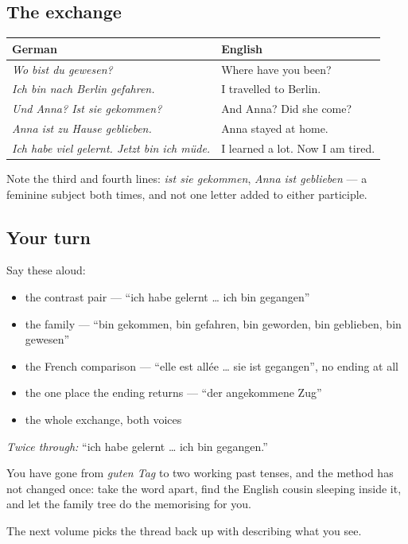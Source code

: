 \subsection*{The exchange}
\noindent
\begin{tabularx}{\linewidth}{@{}>{\raggedright\arraybackslash}X>{\raggedright\arraybackslash}X@{}}
\toprule
\textbf{German} & \textbf{English} \\
\midrule
\emph{Wo bist du gewesen?} & Where have you been? \\
\emph{Ich bin nach Berlin gefahren.} & I travelled to Berlin. \\
\emph{Und Anna? Ist sie gekommen?} & And Anna? Did she come? \\
\emph{Anna ist zu Hause geblieben.} & Anna stayed at home. \\
\emph{Ich habe viel gelernt. Jetzt bin ich müde.} & I learned a lot. Now I am tired. \\
\bottomrule
\end{tabularx}

Note the third and fourth lines: \emph{ist sie gekommen}, \emph{Anna ist geblieben} — a feminine subject both times, and not one letter added to either participle.

\subsection*{Your turn}
Say these aloud:

\begin{itemize}
\raggedright
  \item the contrast pair — \textquotedblleft{}ich habe gelernt … ich bin gegangen\textquotedblright{}
  \item the family — \textquotedblleft{}bin gekommen, bin gefahren, bin geworden, bin geblieben, bin gewesen\textquotedblright{}
  \item the French comparison — \textquotedblleft{}elle est allée … sie ist gegangen\textquotedblright{}, no ending at all
  \item the one place the ending returns — \textquotedblleft{}der angekommene Zug\textquotedblright{}
  \item the whole exchange, both voices
\end{itemize}

\emph{Twice through:} \textquotedblleft{}ich habe gelernt … ich bin gegangen.\textquotedblright{}

\begin{grammarlens}[title={What you've built — where this volume pauses}]
You have gone from \emph{guten Tag} to two working past tenses, and the method has not changed once: take the word apart, find the English cousin sleeping inside it, and let the family tree do the memorising for you.

The next volume picks the thread back up with describing what you see.
\end{grammarlens}

